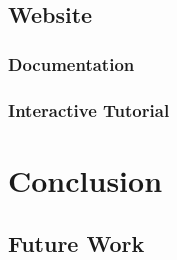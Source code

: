 \documentclass{article}
\begin{document}
\subsection{Website}
\subsubsection{Documentation}
\subsubsection{Interactive Tutorial}

\section{Conclusion}
\subsection{Future Work}
\printbibliography
\listoffigures
\end{document}
